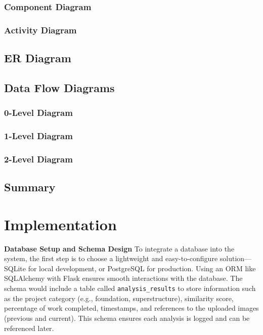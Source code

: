 \documentclass[12pt,a4paper]{report}
\begin{document}
\subsection{Component Diagram}
\subsection{Activity Diagram}

\section{ER Diagram}

\section{Data Flow Diagrams}
\subsection{0-Level Diagram}
\subsection{1-Level Diagram}
\subsection{2-Level Diagram}

\section{Summary}



\chapter{Implementation}
\label{chap:implementation}

\setlength{\baselineskip}{1.5\baselineskip}

\textbf{Database Setup and Schema Design}
To integrate a database into the system, the first step is to choose a lightweight and easy-to-configure solution—SQLite for local development, or PostgreSQL for production. Using an ORM like SQLAlchemy with Flask ensures smooth interactions with the database. The schema would include a table called \texttt{analysis\_results} to store information such as the project category (e.g., foundation, superstructure), similarity score, percentage of work completed, timestamps, and references to the uploaded images (previous and current). This schema ensures each analysis is logged and can be referenced later.
\end{document}
